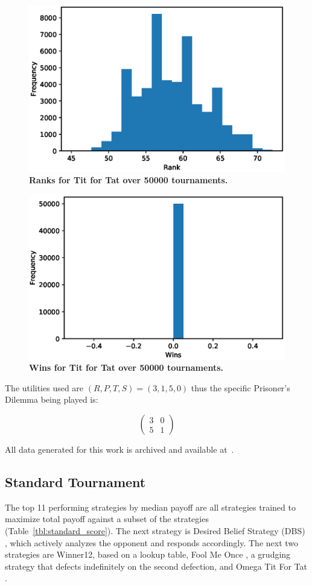 \documentclass[10pt,letterpaper]{article}
\begin{document}
\begin{figure}[!hbtp]
        \centering
        \includegraphics[width=.5\textwidth]{standard_tft_ranks.eps}
        \caption{\bf Ranks for Tit for Tat over
        50000 tournaments.}
        \label{fig:tit_for_tat_ranks}
\end{figure}

\begin{figure}[!hbtp]
        \centering
        \includegraphics[width=.5\textwidth]{standard_tft_wins.eps}
        \caption{\bf Wins for Tit for Tat over
        50000 tournaments.}
        \label{fig:tit_for_tat_wins}
\end{figure}


The utilities used are \((R, P, T, S)=(3, 1, 5, 0)\) thus the specific
Prisoner's Dilemma being played is:

\begin{equation}\label{equ:pd}
    \begin{pmatrix}
        3 & 0\\
        5 & 1
    \end{pmatrix}
\end{equation}

All data generated for this work is archived and available at~\cite{data}.

\subsection*{Standard Tournament}\label{sec:standard}

The top 11 performing strategies by median payoff are all strategies trained to maximize
total payoff against a subset of the strategies (Table~\ref{tbl:standard_score}).
The next strategy is Desired Belief Strategy (DBS) \cite{Au2006},
which actively analyzes the opponent and responds
accordingly. The next two strategies are Winner12, based on a lookup table,
Fool Me Once \cite{axelrodproject}, a grudging strategy that defects indefinitely on
the second defection, and Omega Tit For Tat \cite{kendall2007iterated}.
\end{document}
